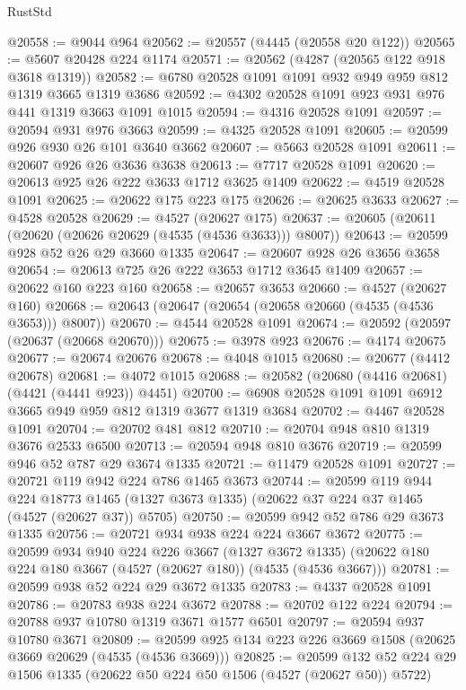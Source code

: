 \begin{lexlean}{RustStd}
\begin{coremodule}
{\begin{coremodule}
{{{{{{{{{{{{{{{{{{{{{{{{{{{{{{{{{{{{{{@20558 := @9044 @964
@20562 := @20557 (@4445 (@20558 @20 @122))
@20565 := @5607 @20428 @224 @1174
@20571 := @20562 (@4287 (@20565 @122 @918 @3618 @1319))
@20582 := @6780 @20528 @1091 @1091 @932 @949 @959 @812 @1319 @3665 @1319 @3686
@20592 := @4302 @20528 @1091 @923 @931 @976 @441 @1319 @3663 @1091 @1015
@20594 := @4316 @20528 @1091
@20597 := @20594 @931 @976 @3663
@20599 := @4325 @20528 @1091
@20605 := @20599 @926 @930 @26 @101 @3640 @3662
@20607 := @5663 @20528 @1091
@20611 := @20607 @926 @26 @3636 @3638
@20613 := @7717 @20528 @1091
@20620 := @20613 @925 @26 @222 @3633 @1712 @3625 @1409
@20622 := @4519 @20528 @1091
@20625 := @20622 @175 @223 @175
@20626 := @20625 @3633
@20627 := @4528 @20528
@20629 := @4527 (@20627 @175)
@20637 := @20605 (@20611 (@20620 (@20626 @20629 (@4535 (@4536 @3633))) @8007))
@20643 := @20599 @928 @52 @26 @29 @3660 @1335
@20647 := @20607 @928 @26 @3656 @3658
@20654 := @20613 @725 @26 @222 @3653 @1712 @3645 @1409
@20657 := @20622 @160 @223 @160
@20658 := @20657 @3653
@20660 := @4527 (@20627 @160)
@20668 := @20643 (@20647 (@20654 (@20658 @20660 (@4535 (@4536 @3653))) @8007))
@20670 := @4544 @20528 @1091
@20674 := @20592 (@20597 (@20637 (@20668 @20670)))
@20675 := @3978 @923
@20676 := @4174 @20675
@20677 := @20674 @20676
@20678 := @4048 @1015
@20680 := @20677 (@4412 @20678)
@20681 := @4072 @1015
@20688 := @20582 (@20680 (@4416 @20681) (@4421 (@4441 @923)) @4451)
@20700 := @6908 @20528 @1091 @1091 @6912 @3665 @949 @959 @812 @1319 @3677 @1319 @3684
@20702 := @4467 @20528 @1091
@20704 := @20702 @481 @812
@20710 := @20704 @948 @810 @1319 @3676 @2533 @6500
@20713 := @20594 @948 @810 @3676
@20719 := @20599 @946 @52 @787 @29 @3674 @1335
@20721 := @11479 @20528 @1091
@20727 := @20721 @119 @942 @224 @786 @1465 @3673
@20744 := @20599
    @119
    @944
    @224
    @18773
    @1465
    (@1327 @3673 @1335)
    (@20622 @37 @224 @37 @1465 (@4527 (@20627 @37)) @5705)
@20750 := @20599 @942 @52 @786 @29 @3673 @1335
@20756 := @20721 @934 @938 @224 @224 @3667 @3672
@20775 := @20599
    @934
    @940
    @224
    @226
    @3667
    (@1327 @3672 @1335)
    (@20622 @180 @224 @180 @3667 (@4527 (@20627 @180)) (@4535 (@4536 @3667)))
@20781 := @20599 @938 @52 @224 @29 @3672 @1335
@20783 := @4337 @20528 @1091
@20786 := @20783 @938 @224 @3672
@20788 := @20702 @122 @224
@20794 := @20788 @937 @10780 @1319 @3671 @1577 @6501
@20797 := @20594 @937 @10780 @3671
@20809 := @20599 @925 @134 @223 @226 @3669 @1508 (@20625 @3669 @20629 (@4535 (@4536 @3669)))
@20825 := @20599
    @132
    @52
    @224
    @29
    @1506
    @1335
    (@20622 @50 @224 @50 @1506 (@4527 (@20627 @50)) @5722)
}}}}}}}}}}}}}}}}}}}}}}}}}}}}}}}}}}}}}}
\end{coremodule}}
\end{coremodule}
\end{lexlean}
